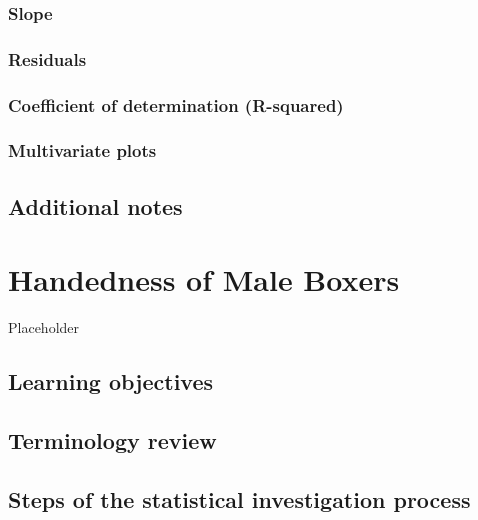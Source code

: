 \documentclass[
]{report}
\begin{document}
\hypertarget{slope}{%
\subsection{Slope}\label{slope}}

\hypertarget{residuals}{%
\subsection{Residuals}\label{residuals}}

\hypertarget{coefficient-of-determination-r-squared}{%
\subsection{Coefficient of determination (R-squared)}\label{coefficient-of-determination-r-squared}}

\hypertarget{multivariate-plots}{%
\subsection{Multivariate plots}\label{multivariate-plots}}

\hypertarget{additional-notes}{%
\section{Additional notes}\label{additional-notes}}

\hypertarget{handedness-of-male-boxers}{%
\chapter{Handedness of Male Boxers}\label{handedness-of-male-boxers}}

Placeholder

\hypertarget{learning-objectives}{%
\section{Learning objectives}\label{learning-objectives}}

\hypertarget{terminology-review}{%
\section{Terminology review}\label{terminology-review}}

\hypertarget{steps-of-the-statistical-investigation-process}{%
\section{Steps of the statistical investigation process}\label{steps-of-the-statistical-investigation-process}}
\end{document}
